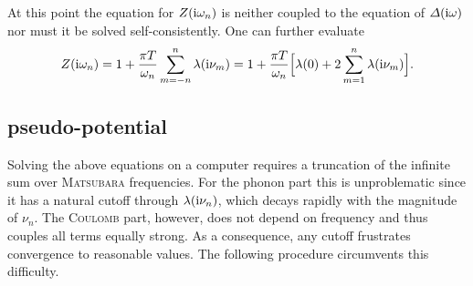 At this point the equation for $Z(\mathrm i \omega_n)$ is neither coupled to the
equation of $\varDelta(\mathrm i \omega)$ nor must it be solved self-consistently. One can
further evaluate
%
\begin{equation*}
    Z(\mathrm i \omega_n) = 1 + \frac{\pi T}{\omega_n} \sum_{m=-n}^n \lambda(\mathrm i \nu_m)
    = 1 + \frac{\pi T}{\omega_n}
    \Big[ \lambda(0) + 2 \sum_{m=1}^n \lambda(\mathrm i \nu_m) \Big].
\end{equation*}

\subsection{ pseudo-potential}

Solving the above equations on a computer requires a truncation of the infinite
sum over \textsc{Matsubara} frequencies. For the phonon part this is
unproblematic since it has a natural cutoff through $\lambda(\mathrm i \nu_n)$, which
decays rapidly with the magnitude of $\nu_n$. The \textsc{Coulomb} part,
however, does not depend on frequency and thus couples all terms equally strong.
As a consequence, any cutoff frustrates convergence to reasonable values. The
following procedure circumvents this difficulty.

